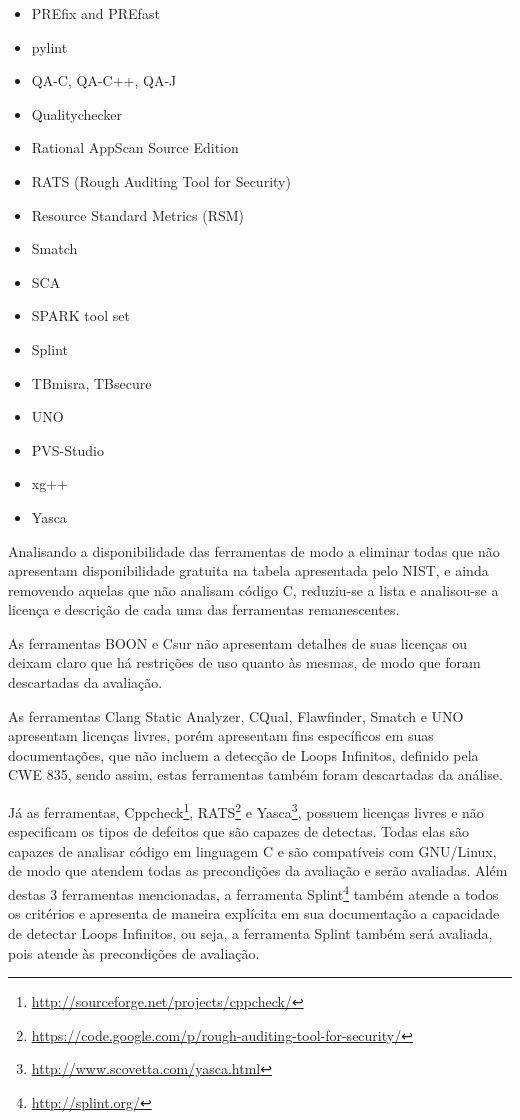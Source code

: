 \begin{itemize}
  \item PREfix and PREfast
  \item pylint
  \item QA-C, QA-C++, QA-J
  \item Qualitychecker
  \item Rational AppScan Source Edition
  \item RATS (Rough Auditing Tool for Security)
  \item Resource Standard Metrics (RSM)
  \item Smatch
  \item SCA
  \item SPARK tool set
  \item Splint
  \item TBmisra\textsuperscript{\textregistered}, TBsecure\textsuperscript{\textregistered}
  \item UNO
  \item PVS-Studio
  \item xg++
  \item Yasca
\end{itemize}

Analisando a disponibilidade das ferramentas de modo a eliminar todas que não apresentam disponibilidade gratuita na tabela apresentada pelo NIST, e ainda removendo aquelas que não analisam código C, reduziu-se a lista e analisou-se a licença e descrição de cada uma das ferramentas remanescentes.

As ferramentas BOON e Csur não apresentam detalhes de suas licenças ou deixam claro que há restrições de uso quanto às mesmas, de modo que foram descartadas da avaliação.

As ferramentas Clang Static Analyzer, CQual, Flawfinder, Smatch e UNO apresentam licenças livres, porém apresentam fins específicos em suas documentações, que não incluem a detecção de Loops Infinitos, definido pela CWE 835, sendo assim, estas ferramentas também foram descartadas da análise.

Já as ferramentas, Cppcheck\footnote{\url{http://sourceforge.net/projects/cppcheck/}}, RATS\footnote{\url{https://code.google.com/p/rough-auditing-tool-for-security/}} e Yasca\footnote{\url{http://www.scovetta.com/yasca.html}}, possuem licenças livres e não especificam os tipos de defeitos que são capazes de detectas. Todas elas são capazes de analisar código em linguagem C e são compatíveis com GNU/Linux, de modo que atendem todas as precondições da avaliação e serão avaliadas. Além destas 3 ferramentas mencionadas, a ferramenta Splint\footnote{\url{http://splint.org/}} também atende a todos os critérios e apresenta de maneira explícita em sua documentação a capacidade de detectar Loops Infinitos, ou seja, a ferramenta Splint também será avaliada, pois atende às precondições de avaliação.

